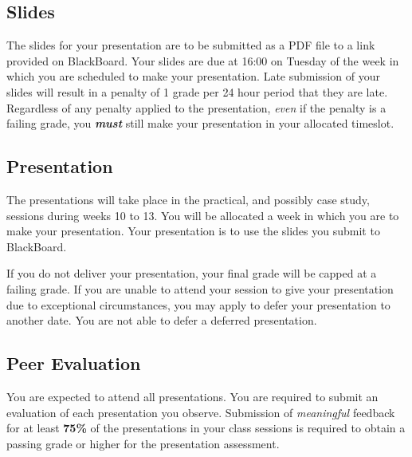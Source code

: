 \documentclass{csse4400}
\begin{document}

\subsection{Slides}
The slides for your presentation are to be submitted as a PDF file to a link provided on BlackBoard.
Your slides are due at 16:00 on Tuesday of the week in which you are scheduled to make your presentation.
Late submission of your slides will result in a penalty of 1 grade per 24 hour period that they are late.
Regardless of any penalty applied to the presentation, \emph{even} if the penalty is a failing grade,
you \textbf{\textit{must}} still make your presentation in your allocated timeslot.

\subsection{Presentation}
The presentations will take place in the practical, and possibly case study, sessions during weeks 10 to 13.
You will be allocated a week in which you are to make your presentation.
Your presentation is to use the slides you submit to BlackBoard.

If you do not deliver your presentation, your final grade will be capped at a failing grade.
If you are unable to attend your session to give your presentation due to exceptional circumstances,
you may apply to defer your presentation to another date.
You are not able to defer a deferred presentation.

\subsection{Peer Evaluation}
You are expected to attend all presentations.
You are required to submit an evaluation of each presentation you observe.
Submission of \emph{meaningful} feedback for at least \textbf{75\%} of the presentations in your class sessions
is required to obtain a passing grade or higher for the presentation assessment.
\end{document}
